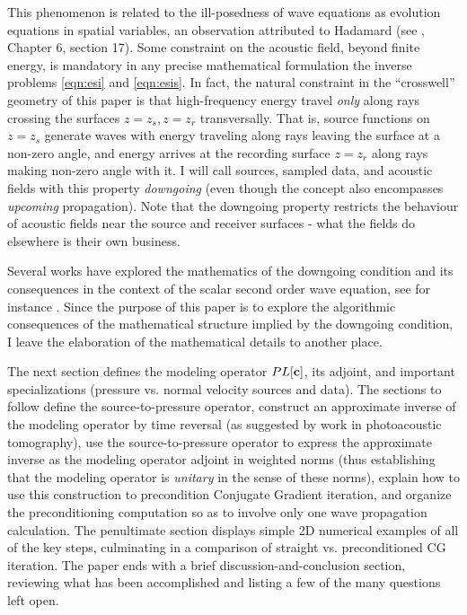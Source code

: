 This
phenomenon is related to the ill-posedness of wave equations as
evolution equations in spatial variables, an observation attributed to
Hadamard (see \cite{CourHil:62}, Chapter 6, section 17). Some constraint on the acoustic field,
beyond finite energy, is mandatory in any precise mathematical formulation the inverse problems
\ref{eqn:esi} and \ref{eqn:esis}. In fact, the natural constraint in
the ``crosswell'' geometry of this paper is that high-frequency energy
travel {\em only} along rays crossing the
surfaces $z=z_s, z=z_r$ transversally. That is, source functions on
$z=z_s$ generate waves with energy traveling along rays leaving the surface at a non-zero angle, and
energy arrives at the recording surface $z=z_r$ along rays making
non-zero angle with it. I will call sources, sampled data, and
acoustic fields with this property {\em
  downgoing} (even though the concept also encompasses {\em upcoming}
propagation). Note that the downgoing property restricts the behaviour of
acoustic fields near the source and receiver surfaces - what the
fields do elsewhere is their own business.

Several works have explored the mathematics of the
downgoing condition and its consequences in the context of the scalar second order wave equation, see for instance
\cite{Payn:75,Symes:83,Lasi:86,LasLionsTrig:86,Lasi:87, BaoSy:91b}. 
Since the purpose of this paper is to explore the algorithmic
consequences of the mathematical structure implied by the downgoing
condition, I leave the elaboration of the mathematical details to
another place.

The next section defines the modeling operator $PL[{\bf c}]$, its
adjoint, and important specializations (pressure vs. normal velocity
sources and data). The sections to follow define the
source-to-pressure operator, construct an approximate inverse of the
modeling operator by time reversal (as suggested by work in
photoacoustic tomography), use the source-to-pressure operator to
express the approximate inverse as the modeling operator adjoint in
weighted norms (thus establishing that the modeling operator is {\em
  unitary} in the sense of these norms), explain how to use this
construction to precondition Conjugate Gradient iteration, and
organize the preconditioning computation so as to involve only one
wave propagation calculation. The penultimate section displays simple
2D numerical examples of all of the key steps, culminating in a
comparison of straight vs. preconditioned CG iteration. The paper ends
with a brief discussion-and-conclusion section, reviewing what has
been accomplished and listing a few of the many questions left open.

